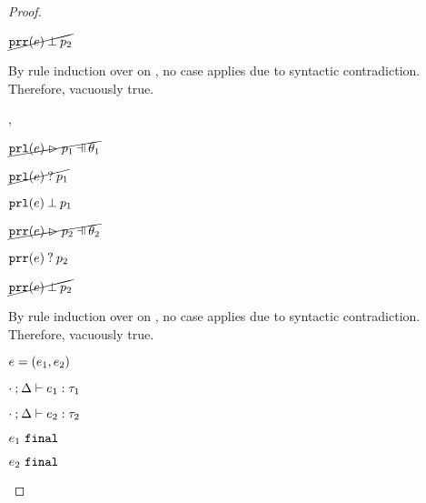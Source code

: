 \begin{proof}
\begin{byCases}
\begin{byCases}
\begin{byCases}
\begin{pfsteps*}
            \item $\cancel{\mathtt{prr}(e) \mathbin{\bot} p_2}$  
            \end{pfsteps*}
            By rule induction over  on , no case applies due to syntactic contradiction.\\
            Therefore, vacuously true.
        \item[\hnotmatch{\hprl{e}}{p_1},\hnotmatch{\hprr{e}}{p_2}]
            \begin{pfsteps*}
            \item $\cancel{\hpatmatch{\hprl{e}}{p_1}{\theta_1}}$  
            \item $\cancel{\mathtt{prl}(e) \mathbin{?} p_1}$  
            \item $\mathtt{prl}(e) \mathbin{\bot} p_1$  
            \item $\cancel{\hpatmatch{\hprr{e}}{p_2}{\theta_2}}$  
            \item $\mathtt{prr}(e) \mathbin{?} p_2$  
            \item $\cancel{\mathtt{prr}(e) \mathbin{\bot} p_2}$  
            \end{pfsteps*}
            By rule induction over  on , no case applies due to syntactic contradiction.\\
            Therefore, vacuously true.
        \end{byCases}
    \item[\text{(\ref{rule:TPair})}]
        \begin{pfsteps*}
        \item $e=(e_1 , e_2)$ 
        \item $\cdot \mathbin{;} \Delta \vdash e_1 : \tau_1$  
        \item $\cdot \mathbin{;} \Delta \vdash e_2 : \tau_2$  
        \item $e_1 ~\mathtt{final}$  
        \item $e_2 ~\mathtt{final}$  

\end{pfsteps*}
\end{byCases}
\end{byCases}
\end{proof}
